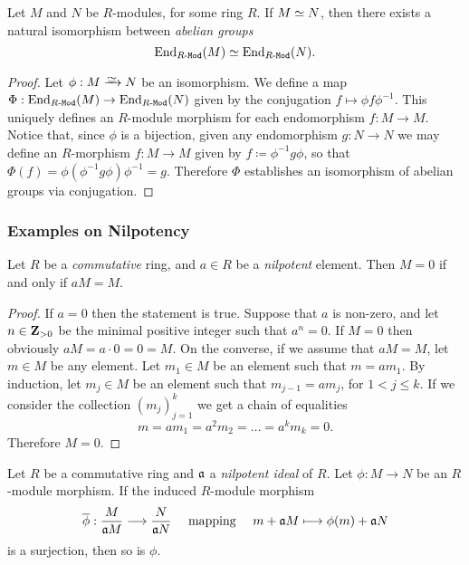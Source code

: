 \begin{proposition}
    \label{prop:M-iso-N-then-iso-between-End}
    Let \(M\) and \(N\) be \(R\)-modules, for some ring \(R\). If \(M \simeq N\), then
    there exists a natural isomorphism between \emph{abelian groups}
    \[
        \operatorname{End}_{{R\text{-}\texttt{Mod}}}(M) \simeq \operatorname{End}_{{R\text{-}\texttt{Mod}}}(N).
    \]
\end{proposition}

\begin{proof}
    Let \(\phi: M \isoto N\) be an isomorphism. We define a map
    \(\Phi: \operatorname{End}_{{R\text{-}\texttt{Mod}}}(M) \to \operatorname{End}_{{R\text{-}\texttt{Mod}}}(N)\) given by the conjugation \(f
    \mapsto \phi f \phi^{-1}\). This uniquely defines an \(R\)-module morphism for
    each endomorphism \(f: M \to M\). Notice that, since \(\phi\) is a bijection,
    given any endomorphism \(g: N \to N\) we may define an \(R\)-morphism \(f: M \to
    M\) given by \(f \coloneq \phi^{-1} g \phi\), so that \(\Phi(f) = \phi
    (\phi^{-1} g \phi) \phi^{-1} = g\). Therefore \(\Phi\) establishes an isomorphism
    of abelian groups via conjugation.
\end{proof}

\subsubsection{Examples on Nilpotency}

\begin{lemma}
    \label{lem:nakayama-particular-case}
    Let \(R\) be a \emph{commutative} ring, and \(a \in R\) be a \emph{nilpotent}
    element. Then \(M = 0\) if and only if \(a M = M\).
\end{lemma}

\begin{proof}
    If \(a = 0\) then the statement is true. Suppose that \(a\) is non-zero, and let
    \(n \in \mathbf{Z}_{>0}\) be the minimal positive integer such that \(a^n = 0\). If
    \(M = 0\) then obviously \(a M = a \cdot 0 = 0 = M\). On the converse, if we
    assume that \(a M = M\), let \(m \in M\) be any element. Let \(m_1 \in M\) be an
    element such that \(m = a m_1\). By induction, let \(m_j \in M\) be an element
    such that \(m_{j-1} = a m_j\), for \(1 < j \leq k\). If we consider the
    collection \((m_j)_{j=1}^k\) we get a chain of equalities
    \[
        m = a m_1 = a^2 m_2 = \dots = a^k m_k = 0.
    \]
    Therefore \(M = 0\).
\end{proof}

\begin{proposition}
    \label{prop:induced-surjective-nilpotent-ideal}
    Let \(R\) be a commutative ring and \(\mathfrak{a}\) a \emph{nilpotent ideal} of
    \(R\). Let \(\phi: M \to N\) be an \(R\)-module morphism. If the induced
    \(R\)-module morphism
    \[
        \overline{\phi}: \frac{M}{\mathfrak{a} M} \longrightarrow \frac{N}{\mathfrak{a} N}
        \quad\text{ mapping }\quad
        m + \mathfrak{a} M \longmapsto \phi(m) + \mathfrak{a} N
    \]
    is a surjection, then so is \(\phi\).
\end{proposition}


